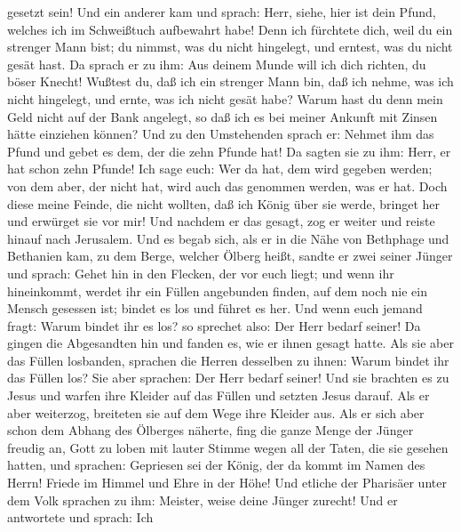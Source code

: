 gesetzt sein!  Und ein anderer kam und sprach: Herr,
siehe, hier ist dein Pfund, welches ich im Schweißtuch aufbewahrt habe!
 Denn ich fürchtete dich, weil du ein strenger Mann bist;
du nimmst, was du nicht hingelegt, und erntest, was du nicht gesät hast.
 Da sprach er zu ihm: Aus deinem Munde will ich dich
richten, du böser Knecht! Wußtest du, daß ich ein strenger Mann bin, daß
ich nehme, was ich nicht hingelegt, und ernte, was ich nicht gesät habe?
 Warum hast du denn mein Geld nicht auf der Bank
angelegt, so daß ich es bei meiner Ankunft mit Zinsen hätte einziehen
können?  Und zu den Umstehenden sprach er: Nehmet ihm das
Pfund und gebet es dem, der die zehn Pfunde hat!  Da
sagten sie zu ihm: Herr, er hat schon zehn Pfunde!  Ich
sage euch: Wer da hat, dem wird gegeben werden; von dem aber, der nicht
hat, wird auch das genommen werden, was er hat.  Doch
diese meine Feinde, die nicht wollten, daß ich König über sie werde,
bringet her und erwürget sie vor mir!  Und nachdem er das
gesagt, zog er weiter und reiste hinauf nach Jerusalem. 
Und es begab sich, als er in die Nähe von Bethphage und Bethanien kam,
zu dem Berge, welcher Ölberg heißt, sandte er zwei seiner Jünger
 und sprach: Gehet hin in den Flecken, der vor euch
liegt; und wenn ihr hineinkommt, werdet ihr ein Füllen angebunden
finden, auf dem noch nie ein Mensch gesessen ist; bindet es los und
führet es her.  Und wenn euch jemand fragt: Warum bindet
ihr es los? so sprechet also: Der Herr bedarf seiner!  Da
gingen die Abgesandten hin und fanden es, wie er ihnen gesagt hatte.
 Als sie aber das Füllen losbanden, sprachen die Herren
desselben zu ihnen: Warum bindet ihr das Füllen los?  Sie
aber sprachen: Der Herr bedarf seiner!  Und sie brachten
es zu Jesus und warfen ihre Kleider auf das Füllen und setzten Jesus
darauf.  Als er aber weiterzog, breiteten sie auf dem
Wege ihre Kleider aus.  Als er sich aber schon dem Abhang
des Ölberges näherte, fing die ganze Menge der Jünger freudig an, Gott
zu loben mit lauter Stimme wegen all der Taten, die sie gesehen hatten,
 und sprachen: Gepriesen sei der König, der da kommt im
Namen des Herrn! Friede im Himmel und Ehre in der Höhe! 
Und etliche der Pharisäer unter dem Volk sprachen zu ihm: Meister, weise
deine Jünger zurecht!  Und er antwortete und sprach: Ich
